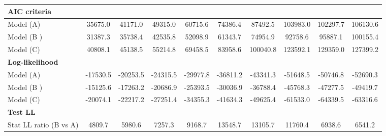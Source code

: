 \documentclass[11pt,twoside, authoryear]{elsarticle}
\begin{document}
\begin{landscape}
\begin{table}[htbp]
{\begin{tabular}{l|c|c|c|c|c|c|c|c|c}
   \multicolumn{10}{l}{ \textbf{AIC criteria}} \\ \hline
    Model (A) & \multicolumn{1}{c}{35675.0} & \multicolumn{1}{c}{41171.0} & \multicolumn{1}{c}{49315.0} & \multicolumn{1}{c}{60715.6} & \multicolumn{1}{c}{74386.4} & \multicolumn{1}{c}{87492.5} & \multicolumn{1}{c}{103983.0} & \multicolumn{1}{c}{102297.7} & \multicolumn{1}{c}{106130.6} \\
    Model (B ) & \multicolumn{1}{c}{31387.3} & \multicolumn{1}{c}{35738.4} & \multicolumn{1}{c}{42535.8} & \multicolumn{1}{c}{52098.9} & \multicolumn{1}{c}{61343.7} & \multicolumn{1}{c}{74954.9} & \multicolumn{1}{c}{92758.6} & \multicolumn{1}{c}{95887.1} & \multicolumn{1}{c}{100155.4} \\
    Model (C) & \multicolumn{1}{c}{40808.1} & \multicolumn{1}{c}{45138.5} & \multicolumn{1}{c}{55214.8} & \multicolumn{1}{c}{69458.5} & \multicolumn{1}{c}{83958.6} & \multicolumn{1}{c}{100040.8} & \multicolumn{1}{c}{123592.1} & \multicolumn{1}{c}{129359.0} & \multicolumn{1}{c}{127399.2} \\ \hline
    \multicolumn{10}{l}{\textbf{Log-likelihood}}\\ \hline
    Model (A) & \multicolumn{1}{c}{-17530.5} & \multicolumn{1}{c}{-20253.5} & \multicolumn{1}{c}{-24315.5} & \multicolumn{1}{c}{-29977.8} & \multicolumn{1}{c}{-36811.2} & \multicolumn{1}{c}{-43341.3} & \multicolumn{1}{c}{-51648.5} & \multicolumn{1}{c}{-50746.8} & \multicolumn{1}{c}{-52690.3} \\
    Model (B ) & \multicolumn{1}{c}{-15125.6} & \multicolumn{1}{c}{-17263.2} & \multicolumn{1}{c}{-20686.9} & \multicolumn{1}{c}{-25393.5} & \multicolumn{1}{c}{-30036.9} & \multicolumn{1}{c}{-36788.4} & \multicolumn{1}{c}{-45768.3} & \multicolumn{1}{c}{-47277.5} & \multicolumn{1}{c}{-49419.7} \\
    Model (C) & \multicolumn{1}{c}{-20074.1} & \multicolumn{1}{c}{-22217.2} & \multicolumn{1}{c}{-27251.4} & \multicolumn{1}{c}{-34355.3} & \multicolumn{1}{c}{-41634.3} & \multicolumn{1}{c}{-49625.4} & \multicolumn{1}{c}{-61533.0} & \multicolumn{1}{c}{-64339.5} & \multicolumn{1}{c}{-63316.6} \\ \hline
    \multicolumn{10}{l}{\textbf{Test LL} }\\ \hline
    Stat LL ratio (B vs A) & \multicolumn{1}{c}{4809.7} & \multicolumn{1}{c}{5980.6} & \multicolumn{1}{c}{7257.3} & \multicolumn{1}{c}{9168.7} & \multicolumn{1}{c}{13548.7} & \multicolumn{1}{c}{13105.7} & \multicolumn{1}{c}{11760.4} & \multicolumn{1}{c}{6938.6} & \multicolumn{1}{c}{6541.2} \\

\end{tabular}}
\end{table}
\end{landscape}
\end{document}
